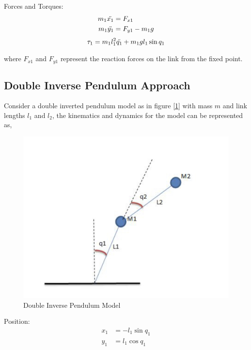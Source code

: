 Forces and Torques:
\begin{equation}
\begin{split}
    m_1\Ddot{x_1} &= F_{x1} \\
    m_1\Ddot{y_1} &= F_{y1} - m_1g
\end{split} 
\end{equation}
\begin{equation}
    \tau_1 = m_1l_1^2\Ddot{q_1} + m_1gl_1\sin{q_1}
\end{equation}

where $F_{x1}$ and $F_{y1}$ represent the reaction forces on the link from the fixed point.

\subsection{Double Inverse Pendulum Approach}

Consider a double inverted pendulum model as in figure [\ref{dipm}] with mass $m$ and link lengths $l_1$ and $l_2$, the kinematics and dynamics for the model can be represented as,

\begin{figure}[h!]
    \centering
    \includegraphics[scale=0.15]{images/dipm.jpeg}\hfill
    \caption{Double Inverse Pendulum Model}\hfill
    \label{dipm}
\end{figure}

Position:
\begin{equation}
\begin{split}
    x_1 &= -l_1\sin{q_1} \\
    y_1 &= l_1\cos{q_1}
\end{split}
\end{equation}

